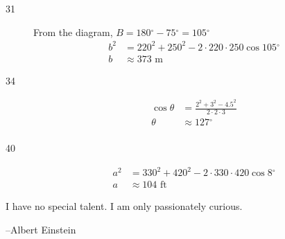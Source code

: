 \documentclass[fleqn,addpoints]{exam}
\newcommand{\degree}{\ensuremath{^\circ}}
\begin{document}
\begin{description}
\item[31]
From the diagram, $B = 180 \degree - 75 \degree = 105 \degree$
\begin{align*}
  b^2 &= 220^2 + 250^2 - 2 \cdot 220 \cdot 250 \cos 105 \degree \\
  b &\approx 373 \text{ m}
\end{align*}

\item[34]
\begin{align*}
  \cos \theta &= \frac{2^2 + 3^2 - 4.5^2}{2 \cdot 2 \cdot 3} \\
  \theta &\approx 127 \degree \\
\end{align*}

\item[40]
\begin{align*}
  a^2 &= 330^2 + 420^2 - 2 \cdot 330 \cdot 420 \cos 8 \degree \\
  a &\approx 104 \text{ ft}
\end{align*}

\end{description}

\else

\vspace{3 in}

\begin{em}

I have no special talent. I am only passionately curious.

\end{em}

\vspace{.2 cm}
\hspace{1.5 cm} --Albert Einstein

\fi
\end{document}
